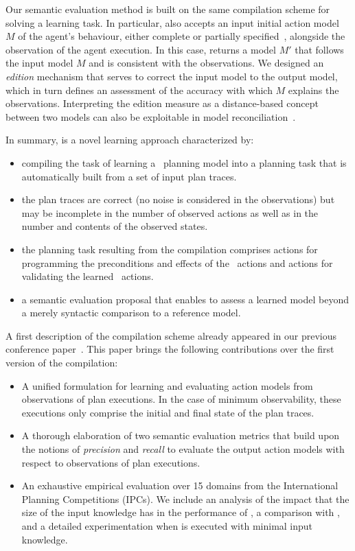 Our semantic evaluation method is built on the same compilation scheme for solving a learning task. In particular, \FAMA also accepts an input initial action model $M$ of the agent's behaviour, either complete or partially specified~\cite{ZhuoNK13,ZhuoK17}, alongside the observation of the agent execution. In this case, \FAMA returns a model $M'$ that follows the input model $M$ and is consistent with the observations. We designed an {\em edition} mechanism that serves to correct the input model to the output model, which in turn defines an assessment of the accuracy with which $M$ explains the observations. Interpreting the edition measure as a distance-based concept between two models can also be exploitable in model reconciliation~\cite{KulkarniCZVZK16}.


In summary, \FAMA is a novel learning approach characterized by:
\begin{itemize}
\item compiling the task of learning a \strips\ planning model into a planning task that is automatically built from a set of input plan traces.
\item the plan traces are correct (no noise is considered in the observations) but may be incomplete in the number of observed actions as well as in the number and contents of the observed states.
\item the planning task resulting from the compilation comprises actions for programming the preconditions and effects of the \strips\ actions and actions for validating the learned \strips\ actions.
\item a semantic evaluation proposal that enables to assess a learned model beyond a merely syntactic comparison to a reference model.
\end{itemize} 

A first description of the \FAMA compilation scheme already appeared in our previous conference paper~\cite{aineto2018learning}. This paper brings the following contributions over the first version of the compilation:

\begin{itemize}
\item A unified formulation for learning and evaluating action models from observations of plan executions. In the case of minimum observability, these executions only comprise the initial and final state of the plan traces.
\item A thorough elaboration of two semantic evaluation metrics that build upon the notions of {\em precision} and {\em recall} to evaluate the output action models with respect to observations of plan executions.
\item An exhaustive empirical evaluation over 15 domains from the International Planning Competitions (IPCs). We include an analysis of the impact that the size of the input knowledge has in the performance of \FAMA, a comparison with \ARMS, and a detailed experimentation when \FAMA is executed with minimal input knowledge.
\end{itemize}


